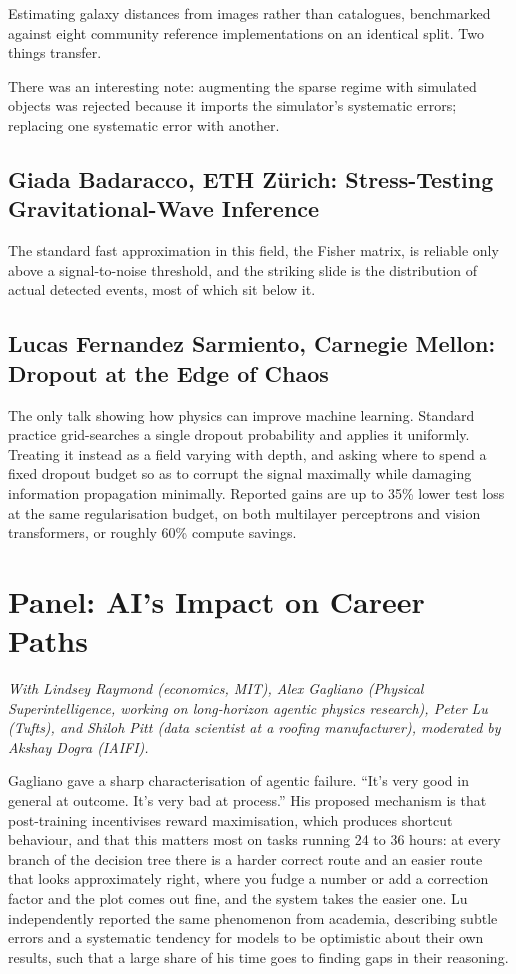 \documentclass[11pt]{article}
\begin{document}
Estimating galaxy distances from images rather than catalogues, benchmarked against eight community reference implementations on an identical split. Two things transfer.

There was an interesting note: augmenting the sparse regime with simulated objects was rejected because it imports the simulator's systematic errors; replacing one systematic error with another.

\subsection*{Giada Badaracco, ETH Z\"urich: Stress-Testing Gravitational-Wave Inference}

The standard fast approximation in this field, the Fisher matrix, is reliable only above a signal-to-noise threshold, and the striking slide is the distribution of actual detected events, most of which sit below it.

\subsection*{Lucas Fernandez Sarmiento, Carnegie Mellon: Dropout at the Edge of Chaos}

The only talk showing how physics can improve machine learning. Standard practice grid-searches a single dropout probability and applies it uniformly. Treating it instead as a field varying with depth, and asking where to spend a fixed dropout budget so as to corrupt the signal maximally while damaging information propagation minimally. Reported gains are up to 35\% lower test loss at the same regularisation budget, on both multilayer perceptrons and vision transformers, or roughly 60\% compute savings.

\section*{Panel: AI's Impact on Career Paths}

\emph{With Lindsey Raymond (economics, MIT), Alex Gagliano (Physical Superintelligence, working on long-horizon agentic physics research), Peter Lu (Tufts), and Shiloh Pitt (data scientist at a roofing manufacturer), moderated by Akshay Dogra (IAIFI).}

Gagliano gave a sharp characterisation of agentic failure. ``It's very good in general at outcome. It's very bad at process.'' His proposed mechanism is that post-training incentivises reward maximisation, which produces shortcut behaviour, and that this matters most on tasks running 24 to 36 hours: at every branch of the decision tree there is a harder correct route and an easier route that looks approximately right, where you fudge a number or add a correction factor and the plot comes out fine, and the system takes the easier one. Lu independently reported the same phenomenon from academia, describing subtle errors and a systematic tendency for models to be optimistic about their own results, such that a large share of his time goes to finding gaps in their reasoning.
\end{document}
